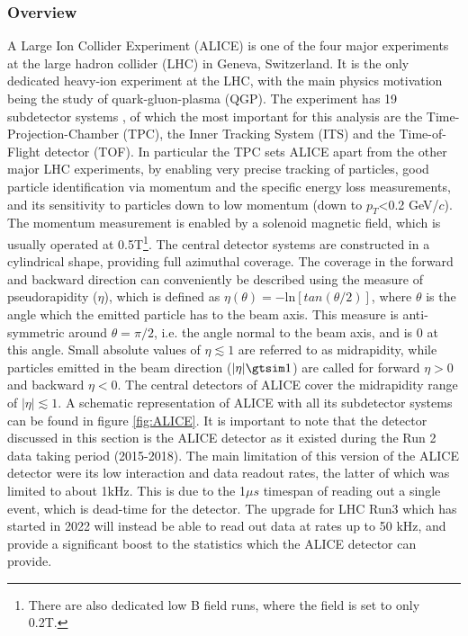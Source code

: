 \subsubsection{Overview}
A Large Ion Collider Experiment (ALICE) is one of the four major experiments at the large hadron collider (LHC) in Geneva, Switzerland. It is the only dedicated heavy-ion experiment at the LHC, with the main physics motivation being the study of quark-gluon-plasma (QGP). The experiment has 19 subdetector systems \cite{}, of which the most important for this analysis are the Time-Projection-Chamber (TPC), the Inner Tracking System (ITS) and the Time-of-Flight detector (TOF). In particular the TPC sets ALICE apart from the other major LHC experiments, by enabling very precise tracking of particles, good particle identification via momentum and the specific energy loss measurements, and its sensitivity to particles down to low momentum (down to $p_T$<0.2 GeV/$c$). The momentum measurement is enabled by a solenoid magnetic field, which is usually operated at 0.5T\footnote{There are also dedicated low B field runs, where the field is set to only 0.2T.}. The central detector systems are constructed in a cylindrical shape, providing full azimuthal coverage. The coverage in the forward and backward direction can conveniently be described using the measure of pseudorapidity ($\eta$), which is defined as $\eta (\theta) = -\mathrm{ln}[tan(\theta/2)]$, where $\theta$ is the angle which the emitted particle has to the beam axis. This measure is anti-symmetric around $\theta = \pi/2$, i.e. the angle normal to the beam axis, and is 0 at this angle. Small absolute values of $\eta \lesssim 1$ are referred to as midrapidity, while particles emitted in the beam direction ($|\eta|\gtsim 1$) are called for forward $\eta >0$ and backward $\eta < 0$. The central detectors of ALICE cover the midrapidity range of $|\eta|\lesssim 1$. A schematic representation of ALICE with all its subdetector systems can be found in figure \ref{fig:ALICE}. It is important to note that the detector discussed in this section is the ALICE detector as it existed during the Run 2 data taking period (2015-2018). The main limitation of this version of the ALICE detector were its low interaction and data readout rates, the latter of which was limited to about 1kHz. This is due to the 1$\mu s$ timespan of reading out a single event, which is dead-time for the detector. The upgrade for LHC Run3 which has started in 2022 will instead be able to read out data at rates up to 50 kHz, and provide a significant boost to the statistics which the ALICE detector can provide.

